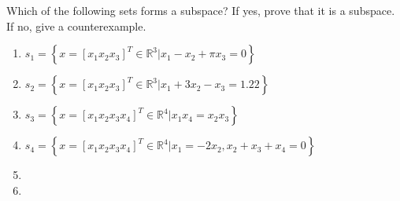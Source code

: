 Which of the following sets forms a subspace? If yes, prove that it is a
subspace. If no, give a counterexample.
\begin{enumerate}[label=(\alph*)]
	\item
	      $s_{1} =
		      \left\{
		      x=\left[x_{1}x_{2}x_{3}\right]^T \in \mathbb{R}^3 | x_1 - x_2 +
		      \pi x_3 = 0
		      \right\}$
	\item
	      $s_{2} =
		      \left\{
		      x=\left[x_{1}x_{2}x_{3}\right]^T \in \mathbb{R}^3 | x_1 + 3x_2 -
		      x_3 = 1.22
		      \right\}$
	\item
	      $s_{3} =
		      \left\{
		      x=\left[x_{1}x_{2}x_{3}x_{4}\right]^T \in \mathbb{R}^4 | x_1x_4 =
		      x_2x_3 \right\}$
	\item
	      $s_{4} =
		      \left\{
		      x=\left[x_{1}x_{2}x_{3}x_{4}\right]^T \in \mathbb{R}^4 | x_1 =
		      -2x_2, x_2 + x_3 + x_4 = 0 \right\}$
	\item
	\item
\end{enumerate}
